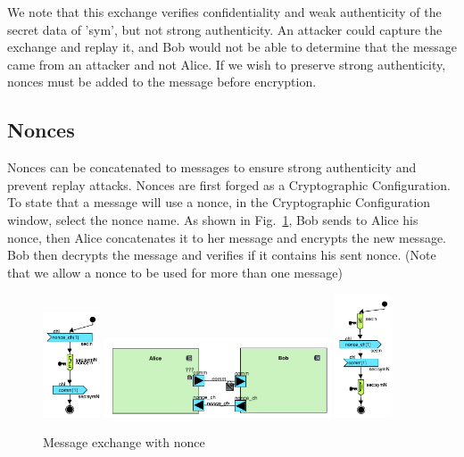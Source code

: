 \documentclass{llncs}
\begin{document}
We note that this exchange verifies confidentiality and weak authenticity of the secret data of 'sym', but not strong
authenticity. An attacker could capture the exchange and replay it, and Bob would not be able to determine that the
message came from an attacker and not Alice. If we wish to preserve strong authenticity, nonces must be added to the
message before encryption.

\subsection{Nonces}

Nonces can be concatenated to messages to ensure strong authenticity and prevent replay attacks. Nonces are first forged
as a Cryptographic Configuration. To state that a message will use a nonce, in the Cryptographic Configuration window,
select the nonce name. As shown in Fig.~\ref{fig:nonce}, Bob sends to Alice his
nonce, then Alice concatenates it to her message and encrypts the new message. Bob then decrypts the message and verifies if it contains his sent nonce. (Note that
we allow a nonce to be used for more than one message)


\begin{figure}[htbp]
	\centering
 	\includegraphics[width=0.15\textwidth]{figures/securityStuff/alice_bob_nonce_ad_alice-svg.pdf}
	\includegraphics[width=0.6\textwidth]{figures/securityStuff/fv_alice_bob_nonce-svg.pdf}
	\includegraphics[width=0.15\textwidth]{figures/securityStuff/alice_bob_nonce_ad_bob-svg.pdf}
	\caption{Message exchange with nonce}
	\label{fig:nonce}
\end{figure}
\end{document}

